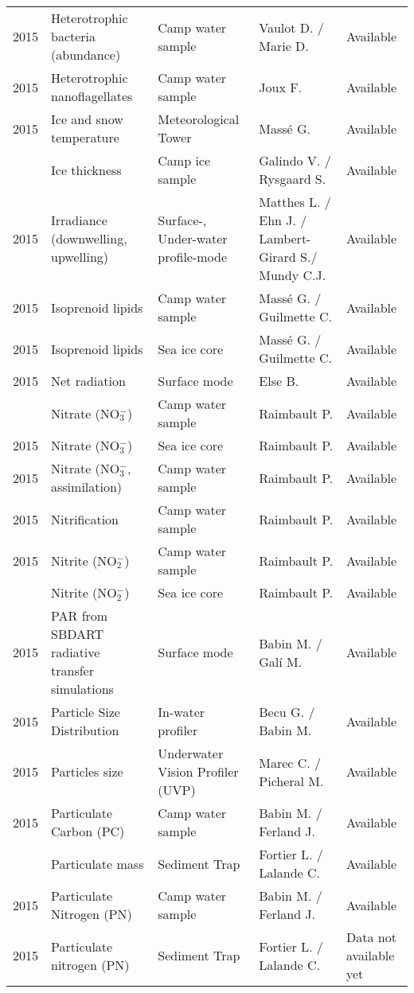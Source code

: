 \documentclass[]{article}
\begin{document}
\begin{landscape}
\begin{longtable}[t]{rllll}
2015 & Heterotrophic bacteria (abundance) & Camp water sample & Vaulot D. / Marie D. & Available\\
2015 & Heterotrophic nanoflagellates & Camp water sample & Joux F. & Available\\
2015 & Ice and snow temperature & Meteorological Tower & Massé G. & Available\\
\addlinespace
2015 & Ice thickness & Camp ice sample & Galindo V. / Rysgaard S. & Available\\
2015 & Irradiance (downwelling, upwelling) & Surface-, Under-water profile-mode & Matthes L. / Ehn J. / Lambert-Girard S./ Mundy C.J. & Available\\
2015 & Isoprenoid lipids & Camp water sample & Massé G. / Guilmette C. & Available\\
2015 & Isoprenoid lipids & Sea ice core & Massé G. / Guilmette C. & Available\\
2015 & Net radiation & Surface mode & Else B. & Available\\
\addlinespace
2015 & Nitrate (NO$^-_3$) & Camp water sample & Raimbault P. & Available\\
2015 & Nitrate (NO$^-_3$) & Sea ice core & Raimbault P. & Available\\
2015 & Nitrate (NO$^-_3$, assimilation) & Camp water sample & Raimbault P. & Available\\
2015 & Nitrification & Camp water sample & Raimbault P. & Available\\
2015 & Nitrite (NO$^-_2$) & Camp water sample & Raimbault P. & Available\\
\addlinespace
2015 & Nitrite (NO$^-_2$) & Sea ice core & Raimbault P. & Available\\
2015 & PAR from SBDART radiative transfer simulations & Surface mode & Babin M. / Galí M. & Available\\
2015 & Particle Size Distribution & In-water profiler & Becu G. / Babin M. & Available\\
2015 & Particles size & Underwater Vision Profiler (UVP) & Marec C. / Picheral M. & Available\\
2015 & Particulate Carbon (PC) & Camp water sample & Babin M. / Ferland J. & Available\\
\addlinespace
2015 & Particulate mass & Sediment Trap & Fortier L. / Lalande C. & Available\\
2015 & Particulate Nitrogen (PN) & Camp water sample & Babin M. / Ferland J. & Available\\
2015 & Particulate nitrogen (PN) & Sediment Trap & Fortier L. / Lalande C. & Data not available yet\\

\end{longtable}
\end{landscape}
\end{document}
